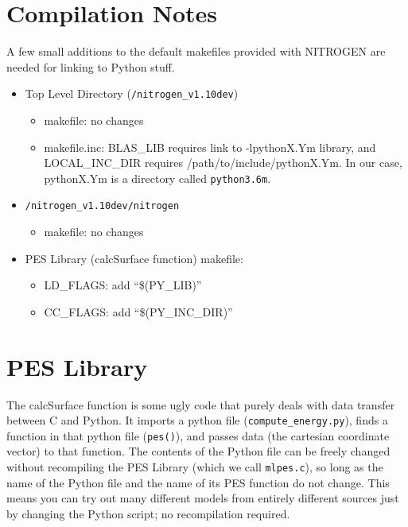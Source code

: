 \documentclass{article}
\begin{document}
\section{Compilation Notes}
A few small additions to the default makefiles provided with NITROGEN are needed for linking to Python stuff.
\begin{itemize}
\item Top Level Directory (\texttt{/nitrogen\_v1.10dev}) 
    \begin{itemize}
    \item makefile: no changes
    \item makefile.inc: BLAS\_LIB requires link to -lpythonX.Ym library, and  LOCAL\_INC\_DIR requires /path/to/include/pythonX.Ym. In our case, pythonX.Ym is a directory called \texttt{python3.6m}.
    \end{itemize}
\item \texttt{/nitrogen\_v1.10dev/nitrogen}
    \begin{itemize}
    \item makefile: no changes
    \end{itemize}
\item PES Library (calcSurface function) makefile: 
    \begin{itemize}
    \item LD\_FLAGS: add ``\$(PY\_LIB)''
    \item CC\_FLAGS: add ``\$(PY\_INC\_DIR)''
    \end{itemize}
\end{itemize}

\newpage
\section{PES Library}
The calcSurface function is some ugly code that purely deals with data transfer between C and Python.
It imports a python file (\texttt{compute\_energy.py}), finds a function in that python file (\texttt{pes()}), and passes data (the cartesian coordinate vector)
to that function. The contents of the Python file can be freely changed without recompiling the PES Library (which we call \texttt{mlpes.c}), so long as the 
name of the Python file and the name of its PES function do not change. This means you can try out many different models from entirely different sources just by changing the Python script; no recompilation required.
\end{document}

